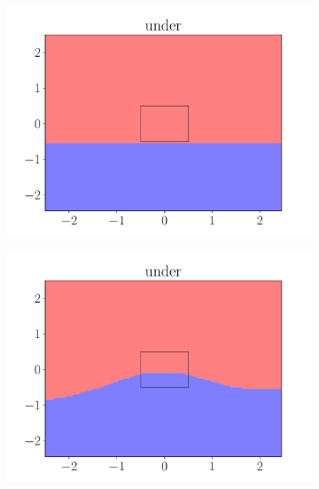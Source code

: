 \documentclass{beamer}
\begin{document}
\begin{frame}
\begin{figure}[ht]
\begin{subfigure}{0.45\textwidth}
            \centering
            \includegraphics[width=\textwidth]{figures/under_rule.pdf}
        \end{subfigure}
        \begin{subfigure}{0.45\textwidth}
            \centering
            \includegraphics[width=\textwidth]{figures/under_predicate_only.pdf}
        \end{subfigure}
    \end{figure}
\end{frame}
\end{document}
